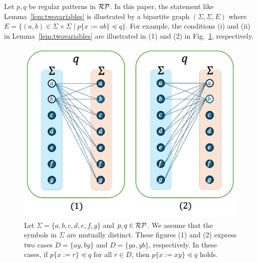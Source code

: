 Let $p,q$ be regular patterns in $\mathcal{RP}$.
In this paper, the statement like Lemma~\ref{lem:twovariables} is illustrated by a bipartite graph $(\Sigma, \Sigma, E)$ where $E = \{(a, b) \in \Sigma\times\Sigma \mid p\{x:=ab\} \preceq q\}$.
For example, the conditions (i) and (ii) in Lemma~\ref{lem:twovariables} are illustrated in (1) and (2) in Fig.~\ref{fig:lem4bigraph}, respectively.

\begin{figure}[t]
  \begin{center}
    \includegraphics[scale=0.525]{figs/lem4bigraph.pdf}
    \caption{Let $\Sigma=\{a,b,c,d,e,f,g\}$ and $p,q \in \mathcal{RP}$. We assume that the symbols in $\Sigma$ are mutually distinct.
    These figures (1) and (2) express two cases $D = \{ ay, by \}$ and $D = \{ ya, yb \}$, respectively.
    In these cases, if $p \{ x := r \} \preceq q$ for all $r \in D$, then $p \{ x := xy \} \preceq q$ holds.}\label{fig:lem4bigraph}
  \end{center}
\end{figure}